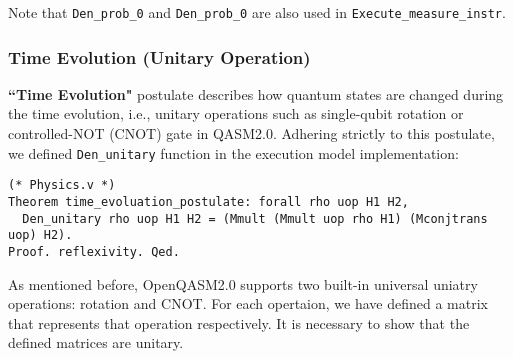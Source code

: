 \documentclass[10pt,a4paper]{article}
\newcommand{\<}{\langle}
\renewcommand{\>}{\rangle}
\begin{document}
Note that \texttt{Den\_prob\_0} and \texttt{Den\_prob\_0} are also used in
\texttt{Execute\_measure\_instr}.


\subsubsection{Time Evolution (Unitary Operation)}

\textbf{``Time Evolution"} postulate describes how quantum states are changed
during the time evolution, i.e., unitary operations such as single-qubit
rotation or controlled-NOT (CNOT) gate in QASM2.0.
Adhering strictly to this postulate, we defined \texttt{Den\_unitary} function in
the execution model implementation:

\begin{lstlisting}
(* Physics.v *)
Theorem time_evoluation_postulate: forall rho uop H1 H2,
  Den_unitary rho uop H1 H2 = (Mmult (Mmult uop rho H1) (Mconjtrans uop) H2).
Proof. reflexivity. Qed.
\end{lstlisting}

As mentioned before, OpenQASM2.0 supports two built-in universal uniatry
operations: rotation and CNOT. For each opertaion, we have defined a matrix
that represents that operation respectively. It is necessary to show that the
defined matrices are unitary.
\end{document}

